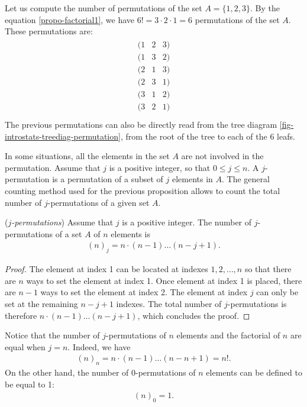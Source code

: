 \begin{example}
Let us compute the number of permutations of the set $A=\{1,2,3\}$.
By the equation \ref{propo-factorial1}, we have $6!=3\cdot 2\cdot 1 = 6$ 
permutations of the set $A$. These permutations are:
\begin{eqnarray}
\begin{array}{ccc}
(1 &     2 &     3) \\
(1 &     3 &     2) \\
(2 &     1 &     3) \\
(2 &     3 &     1) \\
(3 &     1 &     2) \\
(3 &     2 &     1) \\
\end{array}
\end{eqnarray}
The previous permutations can also be directly read from the 
tree diagram \ref{fig-introstats-treediag-permutation}, from the root of the 
tree to each of the 6 leafs.
\end{example}

In some situations, all the elements in the set $A$ are not involved in the 
permutation. Assume that $j$ is a positive integer, so that $0\leq j\leq n$.
A $j$-permutation is a permutation of a subset of $j$ elements in $A$.
The general counting method used for the previous proposition allows 
to count the total number of $j$-permutations of a given set $A$.

\begin{proposition}
(\emph{$j$-permutations})
\label{propo-permutation}
Assume that $j$ is a positive integer. 
The number of $j$-permutations of a set $A$ of $n$ elements is 
\begin{eqnarray}
(n)_j = n \cdot  (n-1)  \ldots  (n-j+1). \label{propo-permutation1}
\end{eqnarray}
\end{proposition}

\begin{proof}
The element at index 1 can be located at indexes $1, 2, \ldots, n$ so that there are 
$n$ ways to set the element at index 1. Once element at index 1 is placed, there are $n-1$ 
ways to set the element at index 2. The element at index $j$ can only be set at the remaining
$n-j+1$ indexes. 
The total number of $j$-permutations is therefore $n\cdot (n-1) \ldots (n-j+1)$,
which concludes the proof. 
\end{proof}

Notice that the number of $j$-permutations of $n$ elements and the factorial of $n$
are equal when $j=n$. Indeed, we have
\begin{eqnarray}
(n)_n = n \cdot  (n-1)  \ldots  (n-n+1) = n!.
\end{eqnarray}
On the other hand, the number of $0$-permutations of $n$ elements 
can be defined to be equal to 1:
\begin{eqnarray}
(n)_0 = 1.
\end{eqnarray}

